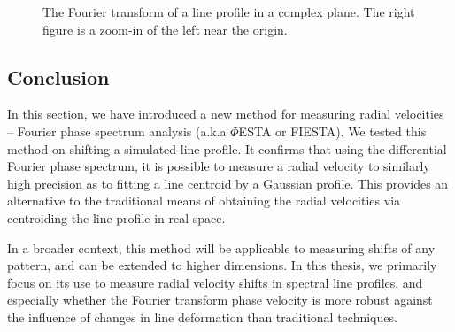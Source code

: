 \begin{figure}[tbp]
    \caption[Fourier transform of a line profile in a complex plane]
    {The Fourier transform of a line profile in a complex plane. The right figure is a zoom-in of the left near the origin.}
\label{fig:FT_compelx_plane}
\end{figure}    
\FloatBarrier

%
%


\subsection{Conclusion}
In this section, we have introduced a new method for measuring radial velocities -- Fourier phase spectrum analysis (a.k.a $\mathit{\Phi}$ESTA or FIESTA). We tested this method on shifting a simulated line profile. It confirms that using the differential Fourier phase spectrum, it is possible to measure a radial velocity to similarly high precision as to fitting a line centroid by a Gaussian profile. This provides an alternative to the traditional means of obtaining the radial velocities via centroiding the line profile in real space. 

In a broader context, this method will be applicable to measuring shifts of any pattern, and can be extended to higher dimensions. In this thesis, we primarily focus on its use to measure radial velocity shifts in spectral line profiles, and especially whether the Fourier transform phase velocity is more robust against the influence of changes in line deformation than traditional techniques.

